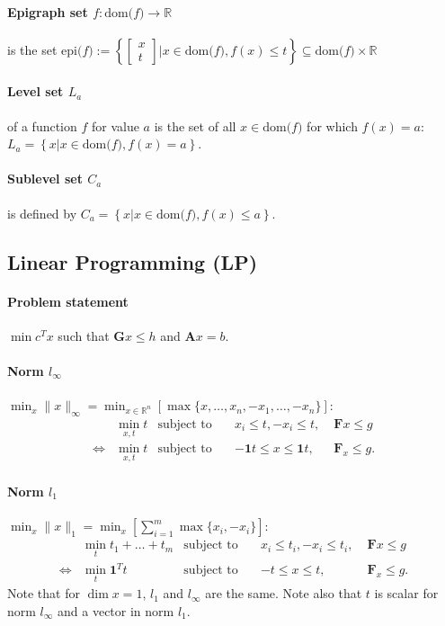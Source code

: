 \documentclass[landscape,a4paper,8pt]{scrartcl}
\newcommand{\R}{\mathbb R}
\newcommand\vA{\bm{A}}
\newcommand\vF{\bm{F}}
\newcommand\vG{\bm{G}}
\newcommand{\Me}[1]{\begin{bmatrix}#1\end{bmatrix}} %
\begin{document}
\begin{multicols*}{3}
\paragraph{Epigraph set $f : \text{dom($f$)} \rightarrow \R$} is the set $\text{epi($f$)} :=
\left\{ \Me{x\\t} | x \in \text{dom($f$)}, f(x) \le t \right\} \subseteq \text{dom($f$)} \times \R$
\paragraph{Level set $L_a$} of a function $f$ for value $a$ is the set of all $x \in \text{dom($f$)}$ for which $f(x) = a$: $L_a = \left\{x | x \in \text{dom($f$)}, f(x) = a\right\}$.
\paragraph{Sublevel set $C_a$} is defined by $C_a = \left\{x | x \in \text{dom($f$)}, f(x) \le a\right\}$.


\subsection{Linear Programming (LP)}
\paragraph{Problem statement} $\min c^Tx$ such that $\vG x \leq h$ and $\vA x = b$.
\paragraph{Norm $l_\infty$}
$\min_x \lVert x \rVert_\infty = \min_{x \in \R^n} \left[ \max\{x,\dots,x_n,-x_1,\dots,-x_n\}\right]$:
\begin{align*}
     & \min_{x,t} t & \text{subject to}\quad & x_i \leq t, -x_i \leq t,   \; & \vF x \leq g \\
\iff & \min_{x,t} t & \text{subject to}\quad & -{\bm 1} t \leq x \leq {\bm 1} t,\; & \vF_x \leq g.
\end{align*}

\paragraph{Norm $l_1$}
$\min_x \lVert x \rVert_1 = \min_x\left[\sum_{i=1}^{m} \max\{x_i,-x_i\}\right]$:
\begin{align*}
     & \min_{t} t_1 + \dots + t_m & \text{subject to}\quad & x_i \leq t_i, -x_i \leq t_i,\; & \vF x \leq g \\
\iff & \min_{t} {\bm 1}^Tt    & \text{subject to}\quad & -t \leq x \leq t,\;            & \vF_x \leq g.
\end{align*}
Note that for $\dim x = 1$, $l_1$ and $l_\infty$ are the same.
Note also that $t$ is scalar for norm $l_\infty$ and a vector in norm $l_1$.


\end{multicols*}
\end{document}
